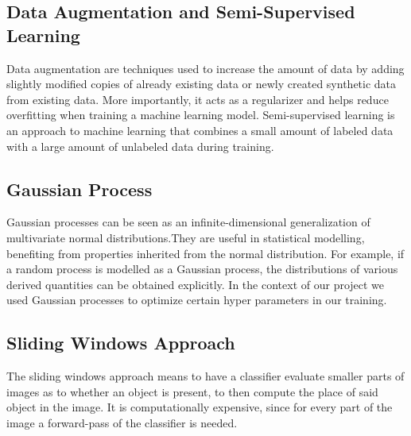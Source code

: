 \subsection{Data Augmentation and Semi-Supervised Learning}
Data augmentation are techniques used to increase the amount of data by adding slightly modified copies of already existing data or newly created synthetic data from existing data. More importantly, it acts as a regularizer and helps reduce overfitting when training a machine learning model. 
Semi-supervised learning is an approach to machine learning that combines a small amount of labeled data with a large amount of unlabeled data during training.

\subsection{Gaussian Process}
Gaussian processes can be seen as an infinite-dimensional generalization of multivariate normal distributions.They are useful in statistical modelling, benefiting from properties inherited from the normal distribution. For example, if a random process is modelled as a Gaussian process, the distributions of various derived quantities can be obtained explicitly. In the context of our project we used Gaussian processes to optimize certain hyper parameters in our training. 

\subsection{Sliding Windows Approach}
The sliding windows approach means to have a classifier evaluate smaller parts of images as to whether an object is present, to then compute the place of said object in the image. It is computationally expensive, since for every part of the image a forward-pass of the classifier is needed. 
